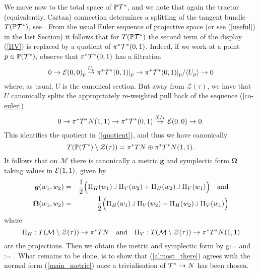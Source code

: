 We move now to the total
space of $\mathbb{P} {\mathcal{T}^*}$, and we note that again the tractor
(equivalently, Cartan) connection determines a splitting of the
tangent bundle $T(\mathbb{P} {\mathcal{T}^*})$, see \cite{CGH-duke}. From the usual Euler sequence
of projective space (or see (\ref{useful}) in the last Section) it
follows that for $T(\mathbb{P} {\mathcal{T}^*})$ the second term of the
display (\ref{HV}) is replaced by a quotient of $\pi^* \mathcal{T}^*(0,1)$.  Indeed, if
we work at a point $p\in \mathbb{P}(\mathcal{T}^*)$, observe that $\pi^*
\mathcal{T}^*(0,1)$ has a filtration
\begin{equation}\label{quotient}
0\to \mathcal{E} (0,0)_p\stackrel{U_p}{\to}  \pi^* \mathcal{T}^*(0,1)|_p \to  \pi^* \mathcal{T}^*(0,1)|_p/\langle U_p \rangle \to 0
\end{equation}
where, as usual, $U$ is the canonical section. 
But away from $\mathcal{Z}(\tau )$, we have that  $U$ canonically splits 
the appropriately re-weighted pull back of  the sequence (\ref{co-euler})
$$
0\to \pi^* T^*N(1,1)   \to \pi^* \mathcal{T}^*(0,1) \stackrel{X/\tau}{\to} \mathcal{E}(0,0) \to 0 .
$$
This identifies the quotient in (\ref{quotient}), and thus we have canonically
$$
T(\mathbb{P}(\mathcal{T}^*)\setminus \mathcal{Z}(\tau))=  \pi^*TN\oplus \pi^*T^*N(1,1).
$$
It follows that on  $\mathcal{M}$
there is canonically a metric $\boldsymbol{g}$ and symplectic form $\boldsymbol{\Omega}$ taking values in $\mathcal{E}(1,1)$, given by
\begin{eqnarray*}
\boldsymbol{g}(w_1,w_2)&=& \frac{1}{2}\Big(
\pp_H(w_1)\hook \pp_V(w_2)+\pp_H(w_2)\hook\pp_V(w_1)\Big) \quad \mbox{and} \\
\boldsymbol{\Omega}(w_1,w_2)&=& \frac{1}{2}\Big(\pp_H(w_1)\hook \pp_V(w_2)-\pp_H(w_2)\hook\pp_V(w_1)\Big)
\end{eqnarray*}
where
$$
\mbox{$\scriptsize{\Pi}$}_H: T(\mathcal{M}\setminus \mathcal{Z}(\tau))\to \pi^*TN \quad \mbox{and} \quad \mbox{$\scriptsize{\Pi}$}_V: T(\mathcal{M}\setminus \mathcal{Z}(\tau))\to \pi^* T^*N(1,1)
$$
are the projections.
Then we obtain the metric and symplectic form by
\be
\label{almost_there}
g:= \qquad \mbox{and} \qquad \Omega:=\boldsymbol{\Omega} .
\ee
What remains to be done, is to show that (\ref{almost_there}) agrees
with the normal form (\ref{main_metric}) once a trivialisation of
$\mathcal{T}^*\rightarrow N$ has been chosen.

